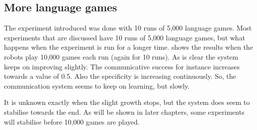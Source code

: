 \subsection{More language games}\label{s:st:10000}

The experiment introduced was done with 10 runs of 5,000 language games. Most experiments that are discussed have 10 runs of 5,000 language games, but what happens when the experiment is run for a longer time.  shows the results when the robots play 10,000 games each run (again for 10 runs). As is clear the system keeps on improving slightly. The communicative success for instance increases towards a value of 0.5. Also the specificity is increasing continuously. So, the communication system seems to keep on learning, but slowly.

It is unknown exactly when the slight growth stops, but the system does seem to stabilise towards the end. As will be shown in later chapters, some experiments will stabilise before 10,000 games are played.

